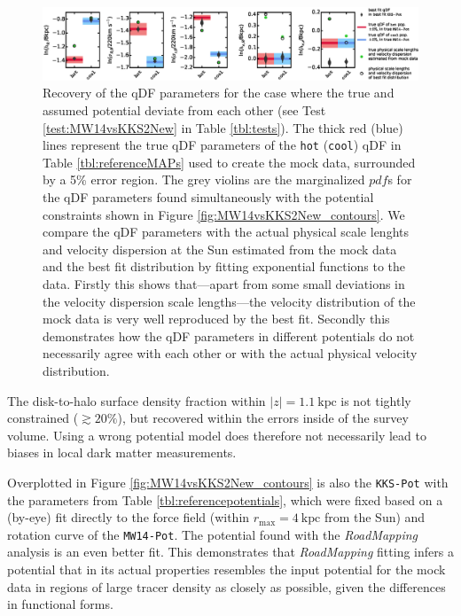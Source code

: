 \documentclass[iop,revtex4,numberedappendix,appendixfloats]{emulateapj}
\newcommand{\pdf}{\ensuremath{pdf}}
\newcommand{\RM}{{\sl RoadMapping}}
\begin{document}
\begin{figure}[!htbp]
\includegraphics[width=1\textwidth]{MW14vsKKS2New_violins.eps}
\caption{Recovery of the qDF parameters for the case where the true and assumed potential deviate from each other (see Test \ref{test:MW14vsKKS2New} in Table \ref{tbl:tests}). The thick red (blue) lines represent the true qDF parameters of the \texttt{hot} (\texttt{cool}) qDF in Table \ref{tbl:referenceMAPs} used to create the mock data, surrounded by a 5\% error region. The grey violins are the marginalized \pdf{}s for the qDF parameters found simultaneously with the potential constraints shown in Figure \ref{fig:MW14vsKKS2New_contours}. We compare the qDF parameters with the actual physical scale lenghts and velocity dispersion at the Sun estimated from the mock data and the best fit distribution by fitting exponential functions to the data. Firstly this shows that---apart from some small deviations in the velocity dispersion scale lengths---the velocity distribution of the mock data is very well reproduced by the best fit. Secondly this demonstrates how the qDF parameters in different potentials do not necessarily agree with each other or with the actual physical velocity distribution.}
\label{fig:MW14vsKKS2New_violins}
\end{figure}

The disk-to-halo surface density fraction within $|z| = 1.1~\text{kpc}$ is not tightly constrained ($\gtrsim20\%$), but recovered within the errors inside of the survey volume. Using a wrong potential model does therefore not necessarily lead to biases in local dark matter measurements.

Overplotted in Figure \ref{fig:MW14vsKKS2New_contours} is also the \texttt{KKS-Pot} with the parameters from Table \ref{tbl:referencepotentials}, which were fixed based on a (by-eye) fit directly to the force field (within $r_\text{max}=4~\text{kpc}$ from the Sun) and rotation curve of the \texttt{MW14-Pot}. The potential found with the \RM{} analysis is an even better fit. This demonstrates that \RM{} fitting infers a potential that in its actual properties resembles the input potential for the mock data in regions of large tracer density as closely as possible, given the differences in functional forms.
\end{document}
